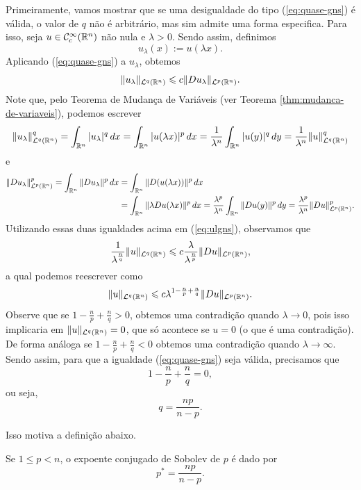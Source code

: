 Primeiramente, vamos mostrar que se uma desigualdade do tipo (\ref{eq:quase-gns}) é válida, o valor de $q$ não é arbitrário, mas sim admite uma forma especifica.
Para isso, seja $u \in \mathcal{C}^\infty_c(\mathbb{R}^n)$ não nula e $\lambda > 0$.
Sendo assim, definimos
\[
    u_\lambda(x) := u(\lambda x).
\]
Aplicando (\ref{eq:quase-gns}) a $u_\lambda$, obtemos
\begin{equation} \label{eq:ulgns}
    \Vert u_\lambda \Vert_{\mathcal{L}^q(\mathbb{R}^n)} \leqslant c \Vert Du_\lambda \Vert_{\mathcal{L}^p(\mathbb{R}^n)}.
\end{equation}
Note que, pelo Teorema de Mudança de Variáveis (ver Teorema \ref{thm:mudanca-de-variaveis}), podemos escrever
\[
    \Vert u_\lambda \Vert_{\mathcal{L}^q(\mathbb{R}^n)}^q = \int_{\mathbb{R}^n} |u_\lambda|^q \,dx = \int_{\mathbb{R}^n} |u(\lambda x)|^p \,dx = \frac{1}{\lambda^n} \int_{\mathbb{R}^n} |u(y)|^q \,dy = \frac{1}{\lambda^n}\Vert u \Vert_{\mathcal{L}^q(\mathbb{R}^n)}^q
\]
e
\[
    \begin{aligned}
        \Vert Du_\lambda \Vert_{\mathcal{L}^p(\mathbb{R}^n)}^p = \int_{\mathbb{R}^n} \Vert Du_\lambda \Vert^p \,dx &= \int_{\mathbb{R}^n} \Vert D(u(\lambda x)) \Vert^p \,dx \\
        &= \int_{\mathbb{R}^n} \Vert \lambda Du(\lambda x) \Vert^p \,dx = \frac{\lambda^p}{\lambda^n} \int_{\mathbb{R}^n} \Vert Du(y) \Vert^p \,dy = \frac{\lambda^p}{\lambda^n}\Vert Du \Vert_{\mathcal{L}^p(\mathbb{R}^n)}^p.
    \end{aligned}
\]
Utilizando essas duas igualdades acima em (\ref{eq:ulgns}), observamos que
\[
    \frac{1}{\lambda^{\frac{n}{q}}} \Vert u \Vert_{\mathcal{L}^q(\mathbb{R}^n)} \leqslant c \frac{\lambda}{\lambda^{\frac{n}{p}}}\Vert Du \Vert_{\mathcal{L}^p(\mathbb{R}^n)},
\]
a qual podemos reescrever como
\begin{equation}
    \Vert u \Vert_{\mathcal{L}^q(\mathbb{R}^n)} \leqslant c\lambda^{1 - \frac{n}{p}  + \frac{n}{q}}\Vert Du \Vert_{\mathcal{L}^p(\mathbb{R}^n)}.
\end{equation}
Observe que se $1 - \frac{n}{p} + \frac{n}{q} > 0$, obtemos uma contradição quando $\lambda \to 0$, pois isso implicaria em $\Vert u \Vert_{\mathcal{L}^q(\mathbb{R}^n)} = 0$,
que só acontece se $u = 0$ (o que é uma contradição).
De forma análoga se $1 - \frac{n}{p} + \frac{n}{q} < 0$ obtemos uma contradição quando $\lambda \to \infty$.
Sendo assim, para que a igualdade (\ref{eq:quase-gns}) seja válida, precisamos que
\[
    1 - \frac{n}{p} + \frac{n}{q} = 0,
\]
ou seja,
\[
    q = \frac{np}{n - p}.
\]

Isso motiva a definição abaixo.
\begin{dbox}
    Se $1 \leqslant p < n$, o expoente conjugado de Sobolev de $p$ é dado por
    \[
        p^* = \frac{np}{n - p}.
    \]
\end{dbox}

